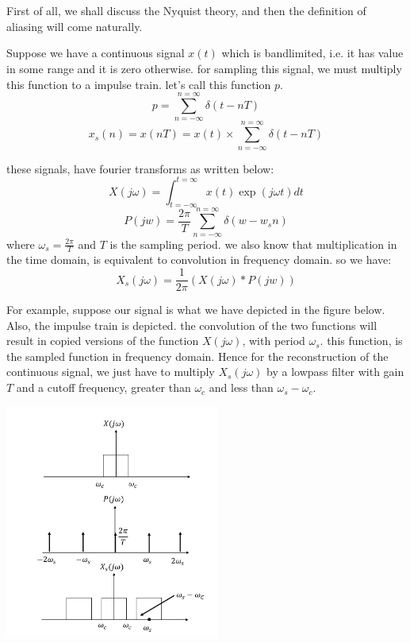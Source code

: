 \documentclass[12pt]{article}
\begin{document}
\section{}
First of all, we shall discuss the Nyquist theory, and then the definition of aliasing will come naturally.

Suppose we have a continuous signal $x(t)$ which is bandlimited, i.e. it has value in some range and it is zero otherwise.
for sampling this signal, we must multiply this function to a impulse train. let's call this function $p$.
$$p =  \sum_{n = -\infty}^{n = \infty} \delta(t - nT) $$
$$ x_s(n) = x(nT) = x(t) \times \sum_{n = -\infty}^{n = \infty} \delta(t - nT) $$

these signals, have fourier transforms as written below:
$$ X(j\omega) = \int_{t = -\infty}^{t = \infty} x(t) \exp(j\omega t) dt$$
$$P(jw) = \frac{2\pi}{T}\sum_{n = -\infty}^{n = \infty} \delta(w - w_s n)$$
where $\omega_s = \frac{2\pi}{T}$ and $T$ is the sampling period.
we also know that multiplication in the time domain, is equivalent to convolution in frequency domain. so we have:
$$X_s(j\omega) = \frac{1}{2\pi} (X(j\omega) * P(jw))$$

For example, suppose our signal is what we have depicted in the figure below. Also, the impulse train is depicted. the convolution of the two functions will result in copied versions of the function $X(j\omega)$, with period $\omega_s$. this function, is the sampled function in frequency domain. Hence for the reconstruction of the continuous signal, we just have to multiply $X_{s}(j\omega)$ by a lowpass filter with gain $T$ and a cutoff frequency, greater than $\omega_c$ and less than $\omega_s - \omega_c$.



	\begin{center}
	  \includegraphics[width=200pt]{fig1.jpg}
	\label{fig_1}
	\end{center}
\end{document}

